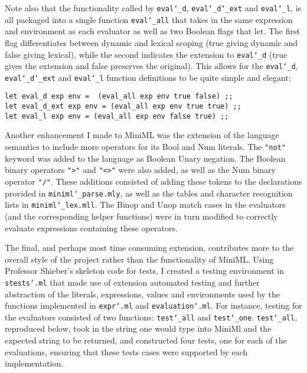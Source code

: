 \documentclass{article}
\begin{document}
Note also that the functionality called by \texttt{eval\char`_d}, \texttt{eval\char`_d\char`_ext} and \texttt{eval\char`_l}, is all packaged into a single function \texttt{eval\char`_all} that takes in the same expression and environment as each evaluator as well as two Boolean flags that let.  The first flag differentiates between dynamic and lexical scoping (true giving dynamic and false giving lexical), while the second indicates the extension to \texttt{eval\char`_d} (true gives the extension and false preserves the original).  This allows for the \texttt{eval\char`_d}, \texttt{eval\char`_d\char`_ext} and \texttt{eval\char`_l} function definitions to be quite simple and elegant:

\begin{lstlisting}
let eval_d exp env =  (eval_all exp env true false) ;;
let eval_d_ext exp env = (eval_all exp env true true) ;;
let eval_l exp env = (eval_all exp env false true) ;;
\end{lstlisting}

\bigskip
Another enhancement I made to MiniML was the extension of the language semantics to include more operators for its Bool and Num literals. The \texttt{"not"} keyword was added to the language as Boolean Unary negation.  The Boolean binary operators \texttt{">"} and \texttt{"<>"} were also added, as well as the Num binary operator \texttt{"/"}.  These additions consisted of adding these tokens to the declarations provided in \texttt{miniml\char`_parse.mly}, as well as the tables and character recognition lists in \texttt{miniml\char`_lex.mll}.  The Binop and Unop match cases in the evaluators (and the corresponding helper functions) were in turn modified to correctly evaluate expressions containing these operators.

The final, and perhaps most time consuming extension, contributes more to the overall style of the project rather than the functionality of MiniML.  Using Professor Shieber's skeleton code for tests, I created a testing environment in \texttt{stests\char`.ml} that made use of extension automated testing and further abstraction of the literals, expressions, values and environments used by the functions implemented in \texttt{expr\char`.ml} and \texttt{evaluation\char`.ml}.  For instance, testing for the evaluators consisted of two functions: \texttt{test\char`_all} and \texttt{test\char`_one}. \texttt{test\char`_all}, reproduced below, took in the string one would type into MiniMl and the expected string to be returned, and constructed four tests, one for each of the evaluations, ensuring that these tests cases were supported by each implementation.
\end{document}
